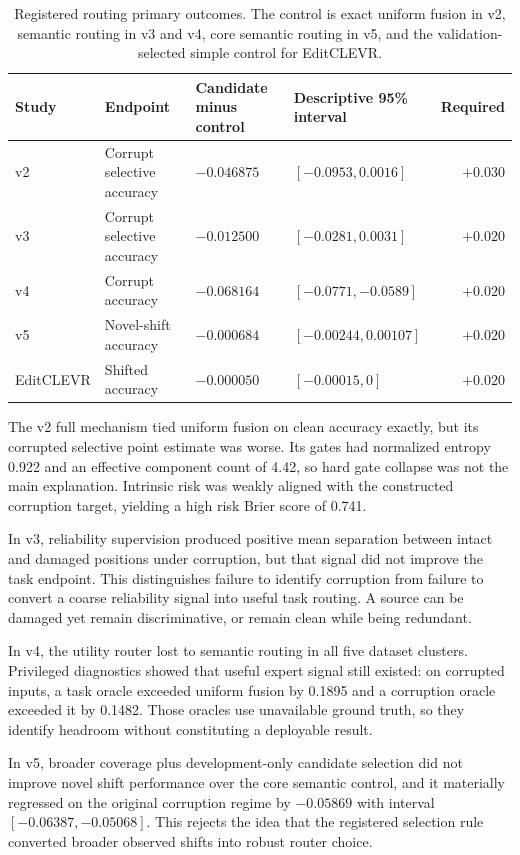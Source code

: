\documentclass[10pt]{article}
\begin{document}
\begin{table}[H]
\centering
\small
\setlength{\tabcolsep}{4.5pt}
\begin{tabular}{llllr}
\toprule
Study & Endpoint & Candidate minus control & Descriptive 95\% interval & Required \\
\midrule
v2 & Corrupt selective accuracy & $-0.046875$ & $[-0.0953, 0.0016]$ & $+0.030$ \\
v3 & Corrupt selective accuracy & $-0.012500$ & $[-0.0281, 0.0031]$ & $+0.020$ \\
v4 & Corrupt accuracy & $-0.068164$ & $[-0.0771,-0.0589]$ & $+0.020$ \\
v5 & Novel-shift accuracy & $-0.000684$ & $[-0.00244,0.00107]$ & $+0.020$ \\
EditCLEVR & Shifted accuracy & $-0.000050$ & $[-0.00015,0]$ & $+0.020$ \\
\bottomrule
\end{tabular}
\caption{Registered routing primary outcomes. The control is exact uniform fusion in v2,
semantic routing in v3 and v4, core semantic routing in v5, and the validation-selected
simple control for EditCLEVR.}
\label{tab:primary}
\end{table}

The v2 full mechanism tied uniform fusion on clean accuracy exactly, but its corrupted
selective point estimate was worse. Its gates had normalized entropy 0.922 and an effective
component count of 4.42, so hard gate collapse was not the main explanation. Intrinsic risk
was weakly aligned with the constructed corruption target, yielding a high risk Brier score
of 0.741.

In v3, reliability supervision produced positive mean separation between intact and
damaged positions under corruption, but that signal did not improve the task endpoint.
This distinguishes failure to identify corruption from failure to convert a coarse
reliability signal into useful task routing. A source can be damaged yet remain
discriminative, or remain clean while being redundant.

In v4, the utility router lost to semantic routing in all five dataset clusters. Privileged
diagnostics showed that useful expert signal still existed: on corrupted inputs, a task
oracle exceeded uniform fusion by 0.1895 and a corruption oracle exceeded it by 0.1482.
Those oracles use unavailable ground truth, so they identify headroom without constituting
a deployable result.

In v5, broader coverage plus development-only candidate selection did not improve novel
shift performance over the core semantic control, and it materially regressed on the
original corruption regime by $-0.05869$ with interval $[-0.06387,-0.05068]$. This rejects
the idea that the registered selection rule converted broader observed shifts into robust
router choice.
\end{document}
